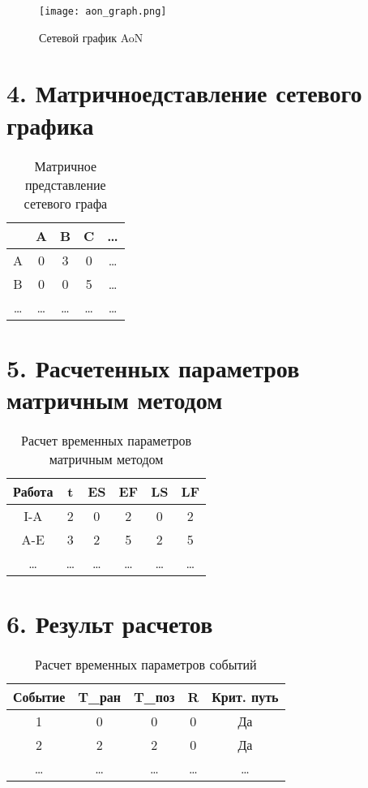 \documentclass[12pt]{article}
\begin{document}
\begin{figure}[H]
    \centering
    \texttt{[image: aon\_graph.png]}
    \caption{Сетевой график AoN}
\end{figure}

\section*{4. Матричноедставление сетевого графика}
\begin{table}[H]
    \centering
    \begin{tabular}{|c|c|c|c|c|}
        \hline
        & A & B & C & \ldots \\
        \hline
        A & 0 & 3 & 0 & \ldots \\
        \hline
        B & 0 & 0 & 5 & \ldots \\
        \hline
        \ldots & \ldots & \ldots & \ldots & \ldots \\
        \hline
    \end{tabular}
    \caption{Матричное представление сетевого графа}
\end{table}

\section*{5. Расчетенных параметров матричным методом}
\begin{table}[H]
    \centering
    \begin{tabular}{|c|c|c|c|c|c|}
        \hline
        Работа & t & ES & EF & LS & LF \\
        \hline
        I-A & 2 & 0 & 2 & 0 & 2 \\
        \hline
        A-E & 3 & 2 & 5 & 2 & 5 \\
        \hline
        \ldots & \ldots & \ldots & \ldots & \ldots & \ldots \\
        \hline
    \end{tabular}
    \caption{Расчет временных параметров матричным методом}
\end{table}

\section*{6. Результ расчетов}
\begin{table}[H]
    \centering
    \begin{tabular}{|c|c|c|c|c|}
        \hline
        Событие & T\_ран & T\_поз & R & Крит. путь \\
        \hline
        1 & 0 & 0 & 0 & Да \\
        \hline
        2 & 2 & 2 & 0 & Да \\
        \hline
        \ldots & \ldots & \ldots & \ldots & \ldots \\
        \hline
    \end{tabular}
    \caption{Расчет временных параметров событий}
\end{table}
\end{document}
